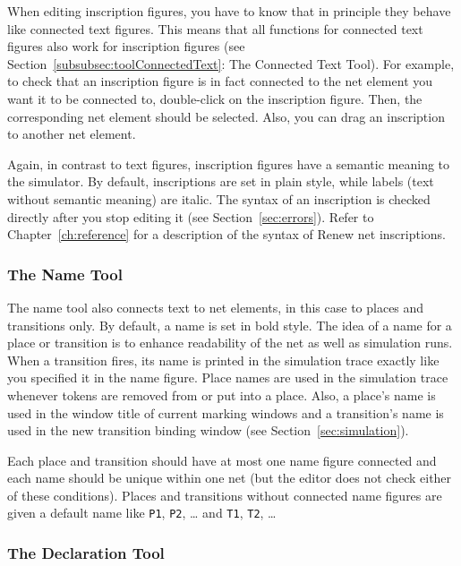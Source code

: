 When editing inscription figures, you have to know that
in principle they behave like connected text figures.
This means that all functions for connected text figures
also work for inscription figures
(see Section~\ref{subsubsec:toolConnectedText}: The Connected Text Tool).
For example, to check that an inscription figure is in fact connected
to the net element you want it to be connected to,
double-click on the inscription figure.
Then, the corresponding net element should be selected.
Also, you can drag an inscription to another net element.

Again, in contrast to text figures, inscription figures have
a semantic meaning to the simulator.
By default, inscriptions are set in plain style, while labels
(text without semantic meaning) are italic.
The syntax of an inscription is checked directly after you stop
editing it (see Section~\ref{sec:errors}).
Refer to Chapter~\ref{ch:reference} for
a description of the syntax of Renew net inscriptions.

\subsubsection{The Name Tool}
\label{subsubsec:toolName}

The name tool also connects text to net elements, in this case
to places and transitions only. By default, a name is set in bold
style.
The idea of a name for a place or transition is to enhance
readability of the net as well as simulation runs.
When a transition
fires, its name is printed in the simulation trace exactly like
you specified it in the name figure.
Place names are used in the simulation trace whenever tokens are removed
from or put into a place.
Also, a place's name is used in the window title of current marking windows
and a transition's name is used in the new transition binding
window (see Section~\ref{sec:simulation}).

Each place and transition should have at most one name figure connected
and each name should be unique within one net
(but the editor does not check either of these conditions).
Places and transitions without connected name figures are given
a default name like \texttt{P1}, \texttt{P2}, \dots{} and
\texttt{T1}, \texttt{T2}, \dots{}

\subsubsection{The Declaration Tool}

